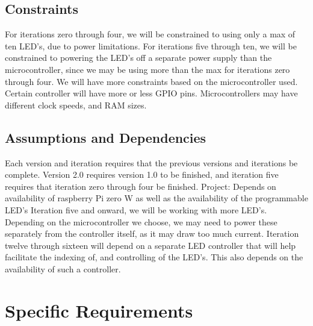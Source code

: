 \documentclass[onecolumn, draftclsnofoot,10pt, compsoc]{IEEEtran}
\begin{document}
		\subsection*{Constraints}
		For iterations zero through four, we will be constrained to using only a max of ten LED’s, due to power limitations. For iterations five through ten, we will be constrained to powering the LED’s off a separate power supply than the microcontroller,
		since we may be using more than the max for iterations zero through four. We will have more constraints based on the microcontroller used. Certain controller will have more or less GPIO pins. Microcontrollers may have different clock speeds, and RAM sizes.

		\subsection*{Assumptions and Dependencies}
		Each version and iteration requires that the previous versions and iterations be complete. Version 2.0 requires version 1.0 to be finished, and iteration five requires that iteration zero through four be finished.
		Project: Depends on availability of raspberry Pi zero W as well as the availability of the programmable LED’s
		Iteration five and onward, we will be working with more LED’s. Depending on the microcontroller we choose, we may need to power these separately from the controller itself, as it may draw too much current.
		Iteration twelve through sixteen will depend on a separate LED controller that will help facilitate the indexing of, and controlling of the LED’s. This also depends on the availability of such a controller.


	\section*{Specific Requirements}
\end{document}
